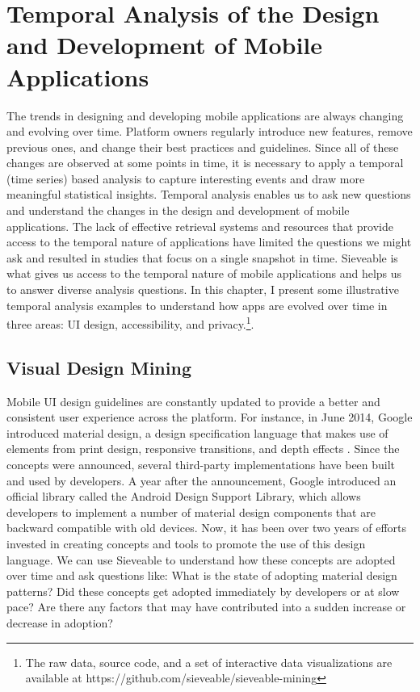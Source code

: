 \chapter{Temporal Analysis of the Design and Development of Mobile Applications}
\label{ch:findings_chapter}
The trends in designing and developing mobile applications are always changing and evolving over time.
Platform owners regularly introduce new features, remove previous ones, and change their best practices and guidelines.
Since all of these changes are observed at some points in time, it is necessary to apply a temporal (time series) based analysis to capture interesting events and draw more meaningful statistical insights.
Temporal analysis enables us to ask new questions and understand the changes in the design and development of mobile applications.
The lack of effective retrieval systems and resources that provide access to the temporal nature of applications have limited the questions we might ask and resulted in studies that focus on a single snapshot in time.
Sieveable is what gives us access to the temporal nature of mobile applications and helps us to answer diverse analysis questions.
In this chapter, I present some illustrative temporal analysis examples to understand how apps are evolved over time in three areas: UI design, accessibility, and privacy.\footnote{The raw data, source code, and a set of interactive data visualizations are available at https://github.com/sieveable/sieveable-mining}.

\section{Visual Design Mining}

Mobile UI design guidelines are constantly updated to provide a better and consistent user experience across the platform.
For instance, in June 2014, Google introduced material design, a design specification language that makes use of elements from print design, responsive transitions, and depth effects \cite{Google_Material_Design}.
Since the concepts were announced, several third-party implementations have been built and used by developers.
A year after the announcement, Google introduced an official library called the Android Design Support Library, which allows developers to implement a number of material design components that are backward compatible with old devices.
Now, it has been over two years of efforts invested in creating concepts and tools to promote the use of this design language.
We can use Sieveable to understand how these concepts are adopted over time and ask questions like:
What is the state of adopting material design patterns?
Did these concepts get adopted immediately by developers or at slow pace?
Are there any factors that may have contributed into a sudden increase or decrease in adoption?

